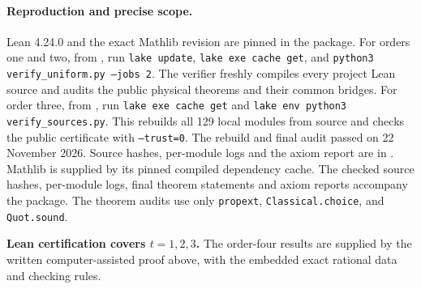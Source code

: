 \documentclass[11pt,a4paper]{article}
\begin{document}
\paragraph{Reproduction and precise scope.}
Lean 4.24.0 and the exact Mathlib revision are pinned in the package.
For orders one and two, from , run \texttt{lake update},
\texttt{lake exe cache get}, and
\texttt{python3 verify\_uniform.py --jobs 2}.
The verifier freshly compiles every project Lean source and audits the
public physical theorems and their common bridges.
For order three, from , run
\texttt{lake exe cache get} and
\texttt{lake env python3 verify\_sources.py}.
This rebuilds all 129 local modules from source and checks the public
certificate with \texttt{--trust=0}. The rebuild and final audit passed
on 22 November 2026. Source hashes, per-module logs and the axiom report
are in .
Mathlib is supplied
by its pinned compiled dependency cache. The checked source hashes,
per-module logs, final theorem statements and axiom reports accompany
the package. The theorem audits use only \texttt{propext},
\texttt{Classical.choice}, and \texttt{Quot.sound}.

\textbf{Lean certification covers $t=1,2,3$.}
The order-four results are supplied by the written computer-assisted
proof above, with the embedded exact rational data and checking rules.
\end{document}
